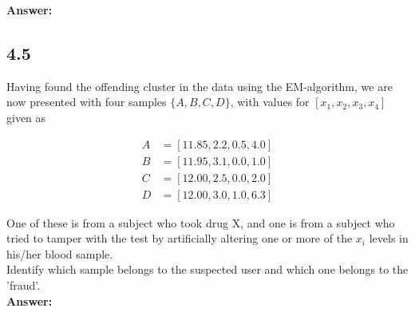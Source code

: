 \documentclass[a4paper]{article}
\begin{document}
\textbf{Answer:}\\



\subsection*{4.5}

Having found the offending cluster in the data using the EM-algorithm, we are now presented with four samples $\{ A, B, C, D\}$, with values for $[x_1, x_2, x_3, x_4]$ given as 

\begin{align*}
A &= [11.85, 2.2, 0.5, 4.0]\\
B &= [11.95, 3.1, 0.0, 1.0]\\
C &= [12.00, 2.5, 0.0, 2.0]\\
D &= [12.00, 3.0, 1.0, 6.3]
\end{align*}

One of these is from a subject who took drug X, and one is from a subject who tried to tamper with the test by artificially altering one or more of the $x_i$ levels in his/her blood sample.\\

Identify which sample belongs to the suspected user and which one belongs to the 'fraud'.\\

\textbf{Answer:}\\
\end{document}

